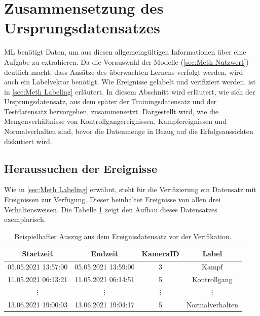 \section{Zusammensetzung des Ursprungsdatensatzes} \label{sec:Meth Datensatz}
\Gls{ML} benötigt Daten, um aus diesen allgemeingültigen Informationen über eine Aufgabe zu extrahieren. Da die Vorauswahl der Modelle (\autoref{sec:Meth Nutzwert}) deutlich macht, dass Ansätze des überwachten Lernens verfolgt werden, wird auch ein \gls{Labelvektor} benötigt. Wie Ereignisse gelabelt und verifiziert werden, ist in \autoref{sec:Meth Labeling} erläutert. In diesem Abschnitt wird erläutert, wie sich der Ursprungsdatensatz, aus dem später der Trainingsdatensatz und der Testdatensatz hervorgehen, zusammensetzt. Dargestellt wird, wie die Mengenverhältnisse von Kontrollgangereignissen, Kampfereignissen und Normalverhalten sind, bevor die Datenmenge in Bezug auf die Erfolgsaussichten diskutiert wird. 

\subsection{Heraussuchen der Ereignisse}
Wie in \autoref{sec:Meth Labeling} erwähnt, steht für die Verifizierung ein Datensatz mit Ereignissen zur Verfügung. Dieser beinhaltet Ereignisse von allen drei Verhaltensweisen. Die Tabelle \ref{tab:bspUnvDataSet} zeigt den Aufbau dieses Datensatzes exemplarisch. 


\begin{table}[ht]
    \centering
    \caption{Beispielhafter Auszug aus dem Ereignisdatensatz vor der Verifikation.}
    \begin{tabular}{|c|c|c|c|}
        \hline
        Startzeit & Endzeit & KameraID & Label\\
        \hline
        05.05.2021 13:57:00 & 05.05.2021 13:59:00 & 3       & Kampf\\
        \hline
        11.05.2021 06:13:21 & 11.05.2021 06:14:51 & 5       & Kontrollgang\\
        \hline
        \vdots              & \vdots              & \vdots  & \vdots\\
        \hline
        13.06.2021 19:00:03 & 13.06.2021 19:04:17 & 5       & Normalverhalten\\
        \hline
    \end{tabular}
    \label{tab:bspUnvDataSet}
\end{table}

